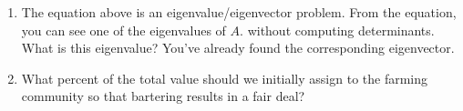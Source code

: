 {\begin{problem}
\begin{enumerate}
$$\begin{bmatrix}
\end{bmatrix}
=
\begin{bmatrix}
 x_1\\x_2\\x_3
\end{bmatrix}
 \quad
\text{or}
\quad 
\begin{bmatrix}
   \frac{1}{2}& \frac{1}{3}& \frac{1}{2}\\
   \frac{1}{4}& \frac{1}{3}& \frac{1}{4}\\
   \frac{1}{4}& \frac{1}{3}& \frac{1}{4}
  \end{bmatrix}
\begin{bmatrix}
 x_1\\x_2\\x_3
\end{bmatrix}
-
\begin{bmatrix}
 x_1\\x_2\\x_3
\end{bmatrix}
=
\begin{bmatrix}
 0\\0\\0
\end{bmatrix}.
$$  
Solve the system. [You should obtain infinitely many solutions.]
\item The equation above is an eigenvalue/eigenvector problem.  From the equation, you can see one of the eigenvalues of $A$. without computing determinants.  What is this eigenvalue? You've already found the corresponding eigenvector. 
\item What percent of the total value should we initially assign to the farming community so that bartering results in a fair deal?
\end{enumerate}
\end{problem}
}















